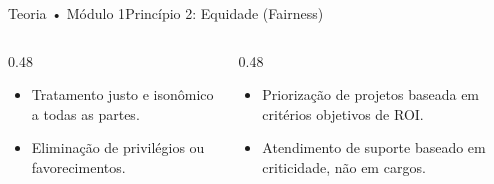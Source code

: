 \begin{senaiframe}{Teoria • Módulo 1}{Princípio 2: Equidade (Fairness)}
  \begin{columns}[t]
    \begin{column}{0.48\textwidth}
      \begin{tcolorbox}[senaibluecard, title={Conceito do IBGC}]
        \begin{itemize}
          \item Tratamento justo e isonômico a todas as partes.
          \item Eliminação de privilégios ou favorecimentos.
        \end{itemize}
      \end{tcolorbox}
    \end{column}
    \begin{column}{0.48\textwidth}
      \begin{tcolorbox}[senaiambercard, title={Aplicação Prática na TI}]
        \begin{itemize}
          \item Priorização de projetos baseada em critérios objetivos de ROI.
          \item Atendimento de suporte baseado em criticidade, não em cargos.
        \end{itemize}
      \end{tcolorbox}
    \end{column}
  \end{columns}
\end{senaiframe}

